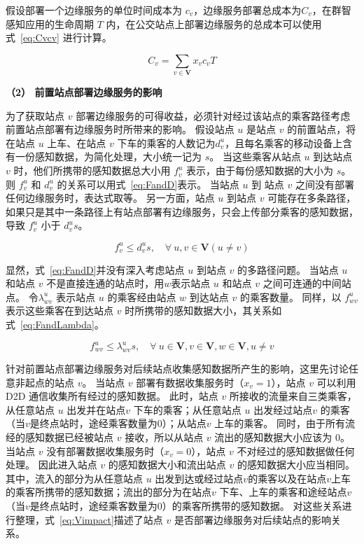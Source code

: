 假设部署一个边缘服务的单位时间成本为 $c_v$，边缘服务部署总成本为$C_v$，在群智感知应用的生命周期 $T$ 内，在公交站点上部署边缘服务的总成本可以使用式~\eqref{eq:Cvcv} 进行计算。

\begin{equation}
\label{eq:Cvcv}
C_v = \sum_{v\in \boldsymbol{V}}x_v c_v T
\end{equation}

\textbf{（2） 前置站点部署边缘服务的影响}

为了获取站点 $v$ 部署边缘服务的可得收益，必须针对经过该站点的乘客路径考虑前置站点部署有边缘服务时所带来的影响。
假设站点 $u$ 是站点 $v$ 的前置站点，将在站点 $u$ 上车、在站点 $v$ 下车的乘客的人数记为$d^u_v$，且每名乘客的移动设备上含有一份感知数据，为简化处理，大小统一记为 $s$。
当这些乘客从站点 $u$ 到达站点 $v$ 时，他们所携带的感知数据总大小用 $f^u_v$ 表示，由于每份感知数据的大小为 $s$。
则 $f^u_v$ 和 $d^u_v$ 的关系可以用式~\eqref{eq:FandD}表示。
当站点 $u$ 到 站点 $v$ 之间没有部署任何边缘服务时，表达式取等。
另一方面，站点 $u$ 到站点 $v$ 可能存在多条路径，如果只是其中一条路径上有站点部署有边缘服务，只会上传部分乘客的感知数据，导致 $f^u_v$ 小于 $d^u_v s$。

\begin{equation}
\label{eq:FandD}
f^u_v \leq d^u_v s, \quad \forall \ u, v\in \boldsymbol{V} (u \neq v)
\end{equation}

显然，式~\eqref{eq:FandD}并没有深入考虑站点 $u$ 到站点 $v$ 的多路径问题。
当站点 $u$ 和站点 $v$ 不是直接连通的站点时，用$w$表示站点 $u$ 和站点 $v$ 之间可连通的中间站点。
令$\lambda^u_{wv}$ 表示站点 $u$ 的乘客经由站点 $w$ 到达站点 $v$ 的乘客数量。
同样，以 $f^u_{wv}$ 表示这些乘客在到达站点 $v$ 时所携带的感知数据大小，其关系如式~\eqref{eq:FandLambda}。

\begin{equation}
\label{eq:FandLambda}
f^u_{wv} \leq \lambda^u_{wv} s, \quad \forall \  u \in \boldsymbol{V}, v \in \boldsymbol{V}, w \in \boldsymbol{V}, u \neq v
\end{equation}

针对前置站点部署边缘服务对后续站点收集感知数据所产生的影响，这里先讨论任意非起点的站点 $v$。
当站点 $v$ 部署有数据收集服务时（$x_v = 1$），站点 $v$ 可以利用 D2D 通信收集所有经过的感知数据。
此时，站点 $v$ 所接收的流量来自三类乘客，从任意站点 $u$ 出发并在站点$v$ 下车的乘客；从任意站点 $u$ 出发经过站点$v$ 的乘客（当$v$是终点站时，途经乘客数量为0）；从站点$v$ 上车的乘客。
同时，由于所有流经的感知数据已经被站点 $v$ 接收，所以从站点 $v$ 流出的感知数据大小应该为 0。
当站点 $v$ 没有部署数据收集服务时（$x_v = 0$），站点 $v$ 不对经过的感知数据做任何处理。
因此进入站点 $v$ 的感知数据大小和流出站点 $v$ 的感知数据大小应当相同。
其中，流入的部分为从任意站点 $u$ 出发到达或经过站点$v$的乘客以及在站点$v$上车的乘客所携带的感知数据；流出的部分为在站点$v$ 下车、上车的乘客和途经站点$v$ （当$v$是终点站时，途经乘客数量为0）的乘客所携带的感知数据。
对这些关系进行整理，式~\eqref{eq:Vimpact}描述了站点 $v$ 是否部署边缘服务对后续站点的影响关系。

